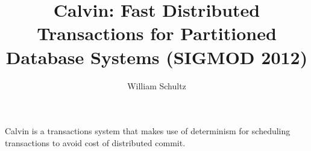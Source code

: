 \documentclass[11pt, oneside]{article}   	%
\title{Calvin: Fast Distributed Transactions
for Partitioned Database Systems (SIGMOD 2012)}
\author{William Schultz}
\begin{document}
\maketitle


Calvin \cite{2012calvin} is a transactions system that makes use of determinism for scheduling transactions to avoid cost of distributed commit.

 

\end{document}
